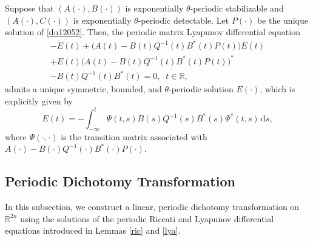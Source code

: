 \documentclass{IEEEtran}
\begin{document}
	\begin{lemma}\label{lya}
		Suppose that $(A(\cdot),B(\cdot))$ is exponentially $\theta$-periodic stabilizable
		and $(A(\cdot), C(\cdot))$ is exponentially $\theta$-periodic detectable. Let $P(\cdot)$ be the unique solution of \eqref{du12052}. Then, the periodic matrix Lyapunov differential equation
		\begin{multline*}
			-\dot{E}(t)+\big(A(t)-B(t)Q^{-1}(t)B^*(t)P(t)\big)E(t)\\
			+E(t)\big(A(t)-B(t)Q^{-1}(t)B^*(t)P(t)\big)^*\\
			-B(t)Q^{-1}(t)B^*(t)=0,\;\;t\in\mathbb R,
		\end{multline*}
		admits a unique symmetric, bounded, and $\theta$-periodic solution $E(\cdot)$, which is explicitly given by
		\begin{equation}\label{lya1}
			E(t)= -\int_{-\infty}^t\Psi(t,s)B(s)Q^{-1}(s)B^*(s)\Psi^*(t,s)\,\mathrm{d}s,
		\end{equation}
		where $\Psi(\cdot,\cdot)$ is the transition matrix associated with $A(\cdot)-B(\cdot)Q^{-1}(\cdot)B^*(\cdot)P(\cdot)$.
	\end{lemma}
	
	\subsection{Periodic Dichotomy Transformation}
	
	In this subsection, we construct a linear, periodic dichotomy transformation on $\mathbb R^{2n}$ using the solutions of the periodic Riccati and Lyapunov differential equations introduced in Lemmas \ref{ric} and \ref{lya}.
	
\end{document}
